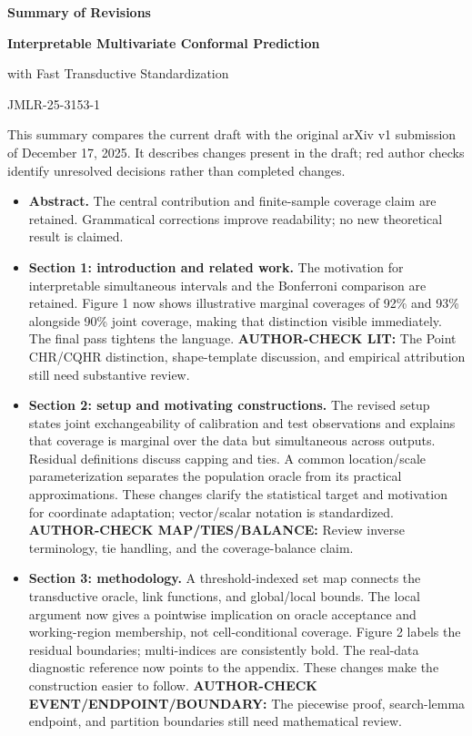 \documentclass[10pt]{article}
\newcommand{\checkauthor}[2]{\textcolor{red!65!black}{\textbf{AUTHOR-CHECK #1:} #2}}
\begin{document}
\begin{center}
{\Large\bfseries Summary of Revisions}\par
\vspace{0.3em}
{\bfseries Interpretable Multivariate Conformal Prediction\par
with Fast Transductive Standardization}\par
JMLR-25-3153-1
\end{center}

This summary compares the current draft with the original arXiv v1
submission of December 17, 2025. It describes changes present in the draft;
red author checks identify unresolved decisions rather than completed changes.

\begin{itemize}
\item \textbf{Abstract.} The central contribution and finite-sample coverage
claim are retained. Grammatical corrections improve readability; no new
theoretical result is claimed.

\item \textbf{Section 1: introduction and related work.} The motivation for
interpretable simultaneous intervals and the Bonferroni comparison are
retained. Figure 1 now shows illustrative marginal coverages of 92\% and
93\% alongside 90\% joint coverage, making that distinction visible
immediately. The final pass tightens the language.
\checkauthor{LIT}{The Point CHR/CQHR distinction, shape-template discussion,
and empirical attribution still need substantive review.}

\item \textbf{Section 2: setup and motivating constructions.} The revised
setup states joint exchangeability of calibration and test observations
and explains that coverage is marginal over the data but simultaneous
across outputs. Residual definitions discuss capping and ties. A common
location/scale parameterization separates the population oracle from its
practical approximations. These changes clarify the statistical target and
motivation for coordinate adaptation; vector/scalar notation is standardized.
\checkauthor{MAP/TIES/BALANCE}{Review inverse terminology, tie handling, and
the coverage-balance claim.}

\item \textbf{Section 3: methodology.} A threshold-indexed set map connects
the transductive oracle, link functions, and global/local bounds. The local
argument now gives a pointwise implication on oracle acceptance and
working-region membership, not cell-conditional coverage. Figure 2 labels
the residual boundaries; multi-indices are consistently bold. The
real-data diagnostic reference now points to the appendix. These changes
make the construction easier to follow.
\checkauthor{EVENT/ENDPOINT/BOUNDARY}{The piecewise proof, search-lemma
endpoint, and partition boundaries still need mathematical review.}


\end{itemize}
\end{document}
